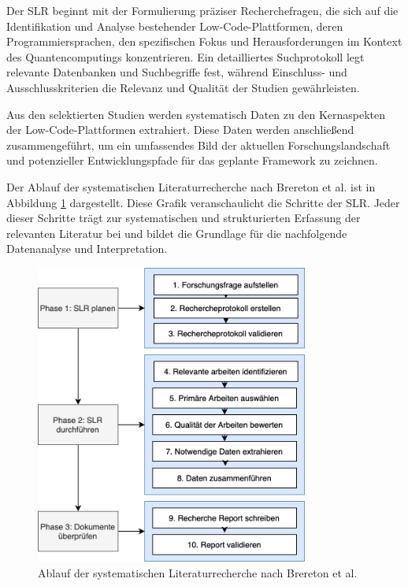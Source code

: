 Der SLR beginnt mit der Formulierung präziser Recherchefragen, die sich auf die 
Identifikation und Analyse bestehender Low-Code-Plattformen, deren Programmiersprachen, 
den spezifischen Fokus und Herausforderungen im Kontext des Quantencomputings 
konzentrieren. Ein detailliertes Suchprotokoll legt relevante Datenbanken und 
Suchbegriffe fest, während Einschluss- und Ausschlusskriterien die Relevanz und Qualität 
der Studien gewährleisten.

Aus den selektierten Studien werden systematisch Daten zu den Kernaspekten der 
Low-Code-Plattformen extrahiert. Diese Daten werden anschließend zusammengeführt, um ein 
umfassendes Bild der aktuellen Forschungslandschaft und potenzieller Entwicklungspfade für 
das geplante Framework zu zeichnen.

Der Ablauf der systematischen Literaturrecherche nach Brereton et al. \cite{brereton2007lessons} 
ist in Abbildung \ref{fig:slr_kitchenham} dargestellt. 
Diese Grafik veranschaulicht die Schritte der SLR. Jeder dieser Schritte trägt zur systematischen und 
strukturierten Erfassung der relevanten Literatur bei und bildet die Grundlage für die nachfolgende 
Datenanalyse und Interpretation.

\begin{figure}[h!]
    \centering
    \includegraphics[width=0.8\textwidth]{graphics/slr_kitchenham_ablauf.png}
    \caption{Ablauf der systematischen Literaturrecherche nach Brereton et al. \cite{brereton2007lessons}}
    \label{fig:slr_kitchenham}
\end{figure}

